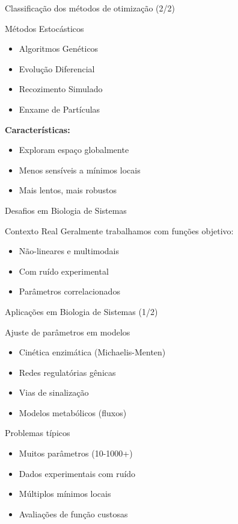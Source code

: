\begin{frame}{Classificação dos métodos de otimização (2/2)}
\begin{block}{Métodos Estocásticos}
\begin{itemize}
    \item Algoritmos Genéticos
    \item Evolução Diferencial
    \item Recozimento Simulado
    \item Enxame de Partículas
\end{itemize}
\textbf{Características:}
\begin{itemize}
    \item Exploram espaço globalmente
    \item Menos sensíveis a mínimos locais
    \item Mais lentos, mais robustos
\end{itemize}
\end{block}
\end{frame}

\begin{frame}{Desafios em Biologia de Sistemas}
\begin{alertblock}{Contexto Real}
Geralmente trabalhamos com funções objetivo:
\begin{itemize}
    \item Não-lineares e multimodais
    \item Com ruído experimental
    \item Parâmetros correlacionados
\end{itemize}
\end{alertblock}
\end{frame}

\begin{frame}{Aplicações em Biologia de Sistemas (1/2)}
\begin{block}{Ajuste de parâmetros em modelos}
\begin{itemize}
    \item Cinética enzimática (Michaelis-Menten)
    \item Redes regulatórias gênicas
    \item Vias de sinalização
    \item Modelos metabólicos (fluxos)
\end{itemize}
\end{block}

\vspace{0.3cm}
\begin{block}{Problemas típicos}
\begin{itemize}
    \item Muitos parâmetros (10-1000+)
    \item Dados experimentais com ruído
    \item Múltiplos mínimos locais
    \item Avaliações de função custosas
\end{itemize}
\end{block}
\end{frame}

